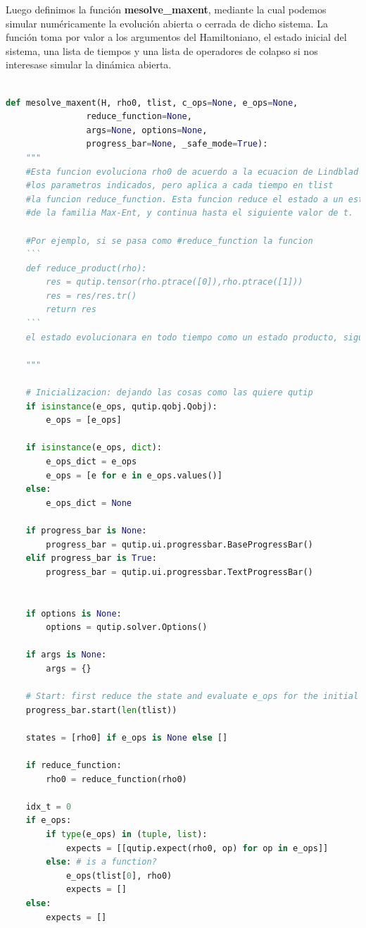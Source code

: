 \documentclass{report} %
\numberwithin{equation}{section}
\begin{document}
Luego definimos la función \textbf{mesolve_maxent}, mediante la cual podemos simular numéricamente la evolución abierta o cerrada de dicho sistema. La función toma por valor a los argumentos del Hamiltoniano, el estado inicial del sistema, una lista de tiempos y una lista de operadores de colapso si nos interesase simular la dinámica abierta.

\begin{lstlisting}[language=Python]
    
def mesolve_maxent(H, rho0, tlist, c_ops=None, e_ops=None, 
                reduce_function=None,
                args=None, options=None, 
                progress_bar=None, _safe_mode=True):
    """
    #Esta funcion evoluciona rho0 de acuerdo a la ecuacion de Lindblad con 
    #los parametros indicados, pero aplica a cada tiempo en tlist 
    #la funcion reduce_function. Esta funcion reduce el estado a un estado
    #de la familia Max-Ent, y continua hasta el siguiente valor de t.
    
    #Por ejemplo, si se pasa como #reduce_function la funcion
    ```
    def reduce_product(rho):
        res = qutip.tensor(rho.ptrace([0]),rho.ptrace([1]))
        res = res/res.tr()
        return res
    ```
    el estado evolucionara en todo tiempo como un estado producto, siguiendo una dinamica semejante a la de Lindblad.
    
    """
    
    # Inicializacion: dejando las cosas como las quiere qutip
    if isinstance(e_ops, qutip.qobj.Qobj):
        e_ops = [e_ops]

    if isinstance(e_ops, dict):
        e_ops_dict = e_ops
        e_ops = [e for e in e_ops.values()]
    else:
        e_ops_dict = None
        
    if progress_bar is None:
        progress_bar = qutip.ui.progressbar.BaseProgressBar()
    elif progress_bar is True:
        progress_bar = qutip.ui.progressbar.TextProgressBar()
    
    
    if options is None:
        options = qutip.solver.Options()
    
    if args is None:
        args = {}

    # Start: first reduce the state and evaluate e_ops for the initial state
    progress_bar.start(len(tlist))
    
    states = [rho0] if e_ops is None else []

    if reduce_function:
        rho0 = reduce_function(rho0)

    idx_t = 0
    if e_ops:
        if type(e_ops) in (tuple, list):
            expects = [[qutip.expect(rho0, op) for op in e_ops]]
        else: # is a function?
            e_ops(tlist[0], rho0)
            expects = []
    else:
        expects = []
    

\end{lstlisting}
\end{document}
